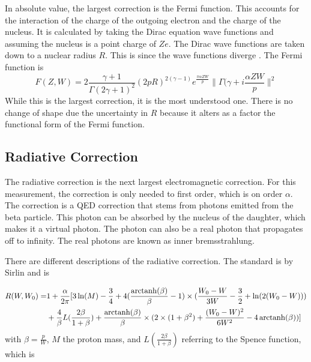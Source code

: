 \documentclass[../MaxHughesThesis.tex]{subfiles}
\begin{document}
In absolute value, the largest correction is the Fermi function.
This accounts for the interaction of the charge of the outgoing electron and the charge of the nucleus.
It is calculated by taking the Dirac equation wave functions and assuming the nucleus is a point charge of $Ze$.
The Dirac wave functions are taken down to a nuclear radius $R$.
This is since the wave functions diverge \cite{Wil89}.
The Fermi function is %
\begin{equation}
	F(Z,W) = 2\frac{\gamma + 1}{\Gamma(2\gamma +1)^{2}}(2pR)^{2(\gamma - 1)}e^{\frac{\pi\alpha ZW}{p}}\|\Gamma(\gamma + i\frac{\alpha ZW}{p}\|^{2}
	\label{eq:fermifunc}
\end{equation}
While this is the largest correction, it is the most understood one.
There is no change of shape due the uncertainty in $R$ because it alters as a factor the functional form of the Fermi function. 

\subsection{Radiative Correction}
The radiative correction is the next largest electromagnetic correction.
For this measurement, the correction is only needed to first order, which is on order $\alpha$.
The correction is a QED correction that stems from photons emitted from the beta particle.
This photon can be absorbed by the nucleus of the daughter, which makes it a virtual photon.
The photon can also be a real photon that propagates off to infinity.
The real photons are known as inner bremsstrahlung.

There are different descriptions of the radiative correction.  
The standard is by Sirlin \cite{Sir67} and is %

\begin{equation}
	\label{eq:sirlinrad}
	\begin{split}
	R(W,W_{0}) = & 1 + \frac{\alpha}{2\pi}[3\ln(M) - \frac{3}{4} + 4(\frac{\operatorname{arctanh}(\beta)}{\beta} - 1)\times(\frac{W_{0} - W}{3W} - \frac{3}{2} + \ln(2(W_{0} - W))) \\
	 & + \frac{4}{\beta}L(\frac{2\beta}{1 + \beta}) + \frac{\operatorname{arctanh}(\beta)}{\beta}\times(2\times(1 + \beta^{2}) + \frac{(W_{0} - W)^{2}}{6W^{2}} - 4 \operatorname{arctanh}(\beta))]
	\end{split}
\end{equation} 
with $\beta = \frac{p}{W}$, $M$ the proton mass, and $L(\frac{2\beta}{1+\beta})$ referring to the Spence function, which is \cite{Wil95} %
\end{document}
